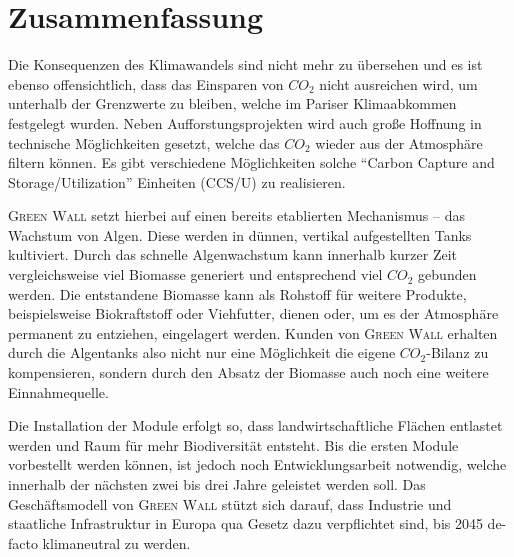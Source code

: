 \chapter{Zusammenfassung}

Die Konsequenzen des Klimawandels sind nicht mehr zu übersehen und es ist ebenso offensichtlich, dass das Einsparen von \(CO_2\) nicht ausreichen wird, um unterhalb der Grenzwerte zu bleiben, welche im Pariser Klimaabkommen festgelegt wurden. 
Neben Aufforstungsprojekten wird auch große Hoffnung in technische Möglichkeiten gesetzt, welche das \(CO_2\) wieder aus der Atmosphäre filtern können. 
Es gibt verschiedene Möglichkeiten solche ``Carbon Capture and Storage/Utilization'' Einheiten (CCS/U) zu realisieren.\par\medskip
%
\textsc{Green Wall} setzt hierbei auf einen bereits etablierten Mechanismus -- das Wachstum von Algen.
Diese werden in dünnen, vertikal aufgestellten Tanks kultiviert.
Durch das schnelle Algenwachstum kann innerhalb kurzer Zeit vergleichsweise viel Biomasse generiert und entsprechend viel \(CO_2\) gebunden werden.
Die entstandene Biomasse kann als Rohstoff für weitere Produkte, beispielsweise Biokraftstoff oder Viehfutter, dienen oder, um es der Atmosphäre permanent zu entziehen, eingelagert werden.
Kunden von \textsc{Green Wall} erhalten durch die Algentanks also nicht nur eine Möglichkeit die eigene \(CO_2\)-Bilanz zu kompensieren, sondern durch den Absatz der Biomasse auch noch eine weitere Einnahmequelle.\par\medskip
%
Die Installation der Module erfolgt so, dass landwirtschaftliche Flächen entlastet werden und Raum für mehr Biodiversität entsteht.
Bis die ersten Module vorbestellt werden können, ist jedoch noch Entwicklungsarbeit notwendig, welche innerhalb der nächsten zwei bis drei Jahre geleistet werden soll.
Das Geschäftsmodell von \textsc{Green Wall} stützt sich darauf, dass Industrie und staatliche Infrastruktur in Europa qua Gesetz dazu verpflichtet sind, bis 2045 de-facto klimaneutral zu werden.
